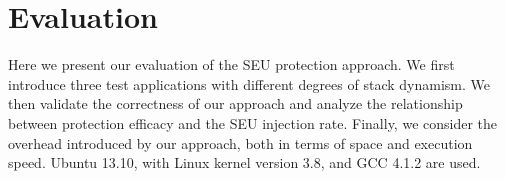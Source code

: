 \vspace{-15pt}
\section{Evaluation}\label{sec:evaluation}
\vspace{-10pt}
Here we present our evaluation of the SEU protection approach. We first introduce three test applications with different degrees of stack dynamism. We then validate the correctness of our approach and analyze the relationship between protection efficacy and the SEU injection rate. Finally, we consider the overhead introduced by our approach, both in terms of space and execution speed. Ubuntu 13.10, with Linux kernel version 3.8, and GCC 4.1.2 are used.

\vspace{-15pt}
